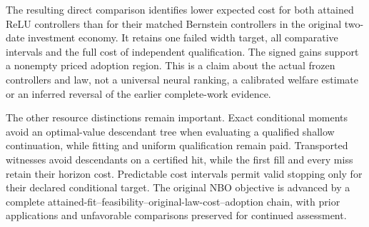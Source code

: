 \documentclass[ecta,nameyear,draft]{econsocart}
\begin{document}
The resulting direct comparison identifies lower expected cost for both attained ReLU controllers than for their matched Bernstein controllers in the original two-date investment economy. It retains one failed width target, all comparative intervals and the full cost of independent qualification. The signed gains support a nonempty priced adoption region. This is a claim about the actual frozen controllers and law, not a universal neural ranking, a calibrated welfare estimate or an inferred reversal of the earlier complete-work evidence.

The other resource distinctions remain important. Exact conditional moments avoid an optimal-value descendant tree when evaluating a qualified shallow continuation, while fitting and uniform qualification remain paid. Transported witnesses avoid descendants on a certified hit, while the first fill and every miss retain their horizon cost. Predictable cost intervals permit valid stopping only for their declared conditional target. The original NBO objective is advanced by a complete attained-fit--feasibility--original-law-cost--adoption chain, with prior applications and unfavorable comparisons preserved for continued assessment.



\end{document}
